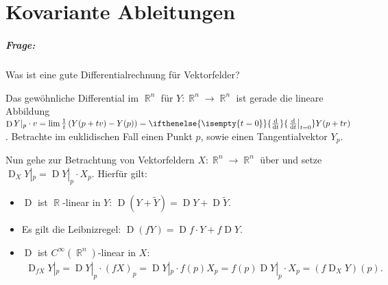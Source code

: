 \documentclass[paper=A4, twoside, chapterprefix=true, bibliography=totoc, headsepline]{scrbook}
\DeclareMathOperator{\R}{\mathbb{R}}
\DeclareMathOperator{\D}{D}         %
\newcommand{\dop}{\mathrm{d}}
\newcommand{\difffrac}[3][]{\ifthenelse{\isempty{#1}}{\frac{\dop #2}{\dop #3}}{\left. \frac{\dop #2}{\dop #3} \right|_{#1}}}
\theoremstyle{plain}
\theoremstyle{nonumberplain}
\theoremstyle{empty}
\theoremstyle{break}
\newcommand{\quot}[1]{\textrm{\glqq}{#1}\textrm{\grqq}}
\begin{document}



\chapter{Kovariante Ableitungen}

\paragraph{Frage:} Was ist eine \quot{gute} Differentialrechnung f\"ur Vektorfelder?

Das gew\"ohnliche Differential im $\R^n$ f\"ur $Y \colon \R^n \to \R^n$ ist gerade die lineare Abbildung $\D Y|_p \cdot v = \lim \frac{1}t \left(Y(p+tv) -Y(p)\right) = \difffrac[t=0]{}{t} Y(p+tr)$.
Betrachte im euklidischen Fall einen Punkt $p$, sowie einen Tangentialvektor $Y_p$.
\begin{center}\end{center}

Nun gehe zur Betrachtung von Vektorfeldern $X \colon \R^n \to \R^n$ \"uber und setze $\D_XY|_p = \D Y|_p\cdot X_p$. Hierf\"ur gilt:
\begin{itemize}
\item $\D$ ist $\R$-linear in $Y$: $\D(Y + \tilde Y) = \D Y + \D \tilde Y$.
\item Es gilt die Leibnizregel: $\D(fY) = \D f \cdot Y + f\D Y$.
\item $\D$ ist $C^{\infty}(\R^n)$-linear in $X$:
  \begin{align*}
    \D_{fX}Y|_p = \D Y|_p\cdot(fX)_p = \D Y|_p \cdot f(p)X_p = f(p) \D Y|_p \cdot X_p = (f \D_XY)(p).
  \end{align*}
\end{itemize}
\end{document}
